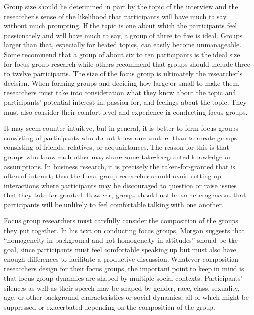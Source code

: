 Group size should be determined in part by the topic of the interview and the researcher's sense of the likelihood that participants will have much to say without much prompting. If the topic is one about which the participants feel passionately and will have much to say, a group of three to five is ideal. Groups larger than that, especially for heated topics, can easily become unmanageable. Some recommend that a group of about six to ten participants is the ideal size for focus group research while others recommend that groups should include three to twelve participants. The size of the focus group is ultimately the researcher's decision. When forming groups and deciding how large or small to make them, researchers must take into consideration what they know about the topic and participants' potential interest in, passion for, and feelings about the topic. They must also consider their comfort level and experience in conducting focus groups. 

It may seem counter-intuitive, but in general, it is better to form focus groups consisting of participants who do not know one another than to create groups consisting of friends, relatives, or acquaintances. The reason for this is that groups who know each other may share some take-for-granted knowledge or assumptions. In business research, it is precisely the taken-for-granted that is often of interest; thus the focus group researcher should avoid setting up interactions where participants may be discouraged to question or raise issues that they take for granted. However, groups should not be so heterogeneous that participants will be unlikely to feel comfortable talking with one another.

Focus group researchers must carefully consider the composition of the groups they put together. In his text on conducting focus groups, Morgan\cite{morgan1996focus} suggests that ``homogeneity in background and not homogeneity in attitudes'' should be the goal, since participants must feel comfortable speaking up but must also have enough differences to facilitate a productive discussion. Whatever composition researchers design for their focus groups, the important point to keep in mind is that focus group dynamics are shaped by multiple social contexts. Participants' silences as well as their speech may be shaped by gender, race, class, sexuality, age, or other background characteristics or social dynamics, all of which might be suppressed or exacerbated depending on the composition of the group.

